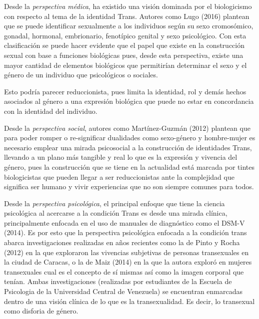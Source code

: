 Desde la \emph{perspectiva médica}, ha existido una visión dominada por el
biologicismo con respecto al tema de la identidad Trans.
Autores como Lugo (2016) plantean que se puede identificar sexualmente a los
individuos según su sexo cromosómico, gonadal, hormonal, embrionario, fenotípico
genital y sexo psicológico.
Con esta clasificación se puede hacer evidente que el papel que existe en la
construcción sexual con base a funciones biológicas pues, desde esta
perspectiva, existe una mayor cantidad de elementos biológicos que
permitirían determinar el sexo y el género de un individuo que psicológicos o
sociales.

Esto podría parecer reduccionista, pues limita la identidad, rol y demás hechos
asociados al género a una expresión biológica que puede no estar en concordancia
con la identidad del individuo.

Desde la \emph{perspectiva social}, autores como Martínez-Guzmán (2012) plantean que
para poder romper o re-significar dualidades como sexo-género y hombre-mujer es
necesario emplear una mirada psicosocial a la construcción de identidades Trans,
llevando a un plano más tangible y real lo que es la expresión y vivencia del
género, pues la construcción que se tiene en la actualidad está marcada por
tintes biologicistas que pueden llegar a ser reduccionistas ante la complejidad
que significa ser humano y vivir experiencias que no son siempre comunes para
todos.

Desde la \emph{perspectiva psicológica}, el principal enfoque que tiene la
ciencia psicológica al acercarse a la condición Trans es desde una mirada
clínica, principalmente enfocada en el uso de manuales de diagnóstico como el
DSM-V (2014).
Es por esto que la perspectiva psicológica enfocada a la condición trans abarca
investigaciones realizadas en años recientes como la de Pinto y Rocha (2012) en
la que exploraron las vivencias subjetivas de personas transexuales en la ciudad
de Caracas, o la de Maiz (2014) en la que la autora exploró en mujeres
transexuales cual es el concepto de sí mismas así como la imagen corporal que
tenían.
Ambas investigaciones (realizadas por estudiantes de la Escuela de Psicologia de
la Universidad Central de Venezuela) se encuentran enmarcadas dentro de una
visión clínica de lo que es la transexualidad.
Es decir, lo transexual como disforia de género.

